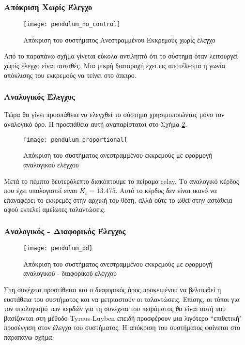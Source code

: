 \subsubsection{Απόκριση Χωρίς Έλεγχο}

\begin{figure}[h]
  \centering
  \texttt{[image: pendulum\_no\_control]}
  \caption{Απόκριση του συστήματος Ανεστραμμένου Εκκρεμούς χωρίς έλεγχο}
  \label{fig:pendulum_no_control}
\end{figure}

Από το παραπάνω σχήμα γίνεται εύκολα αντιληπτό ότι το σύστημα όταν λειτουργεί χωρίς έλεγχο είναι ασταθές. Μια μικρή διαταραχή έχει ως αποτέλεσμα η γωνία απόκλισης του εκκρεμούς να τείνει στο άπειρο.

\subsubsection{Αναλογικός Έλεγχος}

Τώρα θα γίνει προσπάθεια να ελεγχθεί το σύστημα χρησιμοποιώντας μόνο τον αναλογικό όρο. Η προσπάθεια αυτή αναπαρίσταται στο Σχήμα \ref{fig:pendulum_proportional}.

\begin{figure}[h]
  \centering
  \texttt{[image: pendulum\_proportional]}
  \caption{Απόκριση του συστήματος ανεστραμμένου εκκρεμούς με εφαρμογή αναλογικού ελέγχου}
  \label{fig:pendulum_proportional}
\end{figure}
Μετά το πέμπτο δευτερόλεπτο διακόπτουμε το πείραμα relay. Το αναλογικό κέρδος που έχει υπολογιστεί είναι $K_c=13.475$. Αυτό το κέρδος δεν είναι ικανό να επαναφέρει το εκκρεμές στην αρχική του θέση, αλλά ούτε το ωθεί στην αστάθεια αφού εκτελεί αμείωτες ταλαντώσεις. 

\subsubsection{Αναλογικός - Διαφορικός Έλεγχος}

\begin{figure}[h]
  \centering
  \texttt{[image: pendulum\_pd]}
  \caption{Απόκριση του συστήματος ανεστραμμένου εκκρεμούς με εφαρμογή αναλογικού - διαφορικού ελέγχου}
  \label{fig:pendulum_pd}
\end{figure}

Στη συνέχεια προστίθεται και ο διαφορικός όρος προκειμένου να βελτιωθεί η ευστάθεια του συστήματος και να μετριαστούν οι ταλαντώσεις. Επίσης, οι τύποι για τον υπολογισμό των κερδών για τη συνέχεια του πειράματος θα είναι αυτή που βασίζονται στη μέθοδο Tyreus-Luyben επειδή προσφέρουν μια λιγότερο ``επιθετική" προσέγγιση στον έλεγχο του συστήματος. Η απόκριση του συστήματος φαίνεται στο παραπάνω σχήμα.

